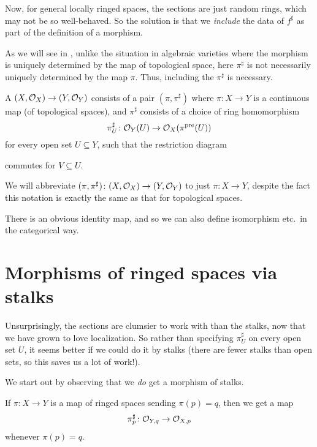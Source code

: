 Now, for general locally ringed spaces,
the sections are just random rings,
which may not be so well-behaved.
So the solution is that we \emph{include} the data of $f^\sharp$
as part of the definition of a morphism.
\begin{remark}
	As we will see in , unlike the situation in algebraic varieties
	where the morphism is uniquely determined by the map of topological space,
	here $\pi^\sharp$ is not necessarily uniquely determined by the map $\pi$.
	Thus, including the $\pi^\sharp$ is necessary.
\end{remark}
\begin{definition}
	A 
	$(X, \mathcal O_X) \to (Y, \mathcal O_Y)$ consists of a pair $(\pi, \pi^\sharp)$
	where $\pi \colon X \to Y$ is a continuous map
	(of topological spaces),
	and $\pi^\sharp$ consists of a choice of ring homomorphism
	\[ \pi^\sharp_U \colon \mathcal O_Y(U) \to \mathcal O_X(\pi^{\text{pre}}(U)) \]
	for every open set $U \subseteq Y$, such that the restriction diagram
	\begin{center}
	\end{center}
	commutes for $V \subseteq U$.
\end{definition}
\begin{abuse}
	We will abbreviate $(\pi, \pi^\sharp) \colon (X, \mathcal O_X) \to (Y, \mathcal O_Y)$
	to just $\pi \colon X \to Y$,
	despite the fact this notation is exactly
	the same as that for topological spaces.
\end{abuse}

There is an obvious identity map,
and so we can also define isomorphism etc.\ in the categorical way.

\section{Morphisms of ringed spaces via stalks}
Unsurprisingly, the sections are clumsier to work with
than the stalks, now that we have grown to love localization.
So rather than specifying $\pi^\sharp_U$ on every open set $U$,
it seems better if we could do it by stalks
(there are fewer stalks than open sets,
so this saves us a lot of work!).

We start out by observing that we \emph{do}
get a morphism of stalks.
\begin{proposition}
	If $\pi \colon X \to Y$ is a map of ringed spaces
	sending $\pi(p) = q$, then we get a map
	\[ \pi_p^\sharp \colon \mathcal O_{Y,q} \to \mathcal O_{X,p} \]
	whenever $\pi(p) = q$.
\end{proposition}

